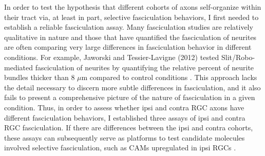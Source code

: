 In order to test the hypothesis that different cohorts of axons self-organize within their tract via, at least in part, selective fasciculation behaviors, I first needed to establish a reliable fasciculation assay.
Many fasciculation studies are relatively qualitative in nature and those that have quantified the fasciculation of neurites \invitro{} are often comparing very large differences in fasciculation behavior in different conditions.
For example, Jaworski and Tessier-Lavigne (2012) tested Slit/Robo-mediated fasciculation of neurites by quantifying the relative percent of neurite bundles thicker than 8 $\mu$m compared to control conditions \cite{jaworski2012autocrine}.
This approach lacks the detail necessary to discern more subtle differences in fasciculation, and it also fails to present a comprehensive picture of the nature of fasciculation in a given condition. 
Thus, in order to assess whether ipsi and contra RGC axons have different fasciculation behaviors, I established three \invitro{} assays of ipsi and contra RGC fasciculation.
If there are differences between the ipsi and contra cohorts, these \invitro{} assays can subsequently serve as platforms to test candidate molecules involved selective fasciculation, such as CAMs upregulated in ipsi RGCs \cite{wang2016ipsilateral}.
